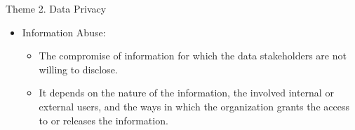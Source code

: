 \documentclass[
 size=14pt,
 paper=smartboard,  %
 mode=present, 		%
 display=slides, 	%
 style=tuliplab,  	%
 pauseslide,
 fleqn,leqno]{powerdot}
\begin{document}
\begin{slide}{Theme 2. Data Privacy}
\begin{itemize}
\item
Information Abuse:


\begin{itemize}
\item
The compromise of information
for which the data stakeholders are not willing to disclose.

\item
It depends on the nature of the information,
the involved internal or external users,
and the ways in which the organization grants the access to
or releases the information.

\end{itemize}
\end{itemize}

\end{slide}


\end{document}

